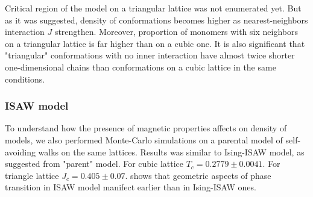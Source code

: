 Critical region of the model on a triangular lattice was not enumerated yet. But as it was suggested, density of conformations becomes higher as nearest-neighbors interaction $J$ strengthen. Moreover, proportion of monomers with six neighbors on a triangular lattice is far higher than on a cubic one. It is also significant that "triangular" conformations with no inner interaction have almost twice shorter one-dimensional chains than conformations on a cubic lattice in the same conditions.

\subsubsection{ISAW model}

To understand how the presence of magnetic properties affects on density of models, we also performed Monte-Carlo simulations on a parental model of self-avoiding walks on the same lattices. Results was similar to Ising-ISAW model, as suggested from "parent" model. For cubic lattice $T_{c} = 0.2779\pm 0.0041 $\cite{Tesi1996}. For triangle lattice $J_{c} = 0.405 \pm 0.07 $\cite{Privman1986}.  shows that geometric aspects of phase transition in ISAW model manifect earlier than in Ising-ISAW ones.  

